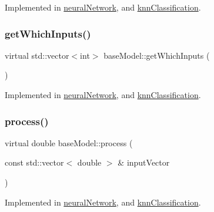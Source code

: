 Implemented in \hyperlink{classneural_network_aaf9ff8b1a88126fcffc1e9f07a4ffe49}{neural\+Network}, and \hyperlink{classknn_classification_a3f9c8fb78c6a66f0ab9440629140400d}{knn\+Classification}.

\mbox{\label{classbase_model_a5d6b7579536f5713eed0b7b4a6687a16}} 
\subsubsection{\texorpdfstring{get\+Which\+Inputs()}{getWhichInputs()}}
{\footnotesize\ttfamily virtual std\+::vector$<$int$>$ base\+Model\+::get\+Which\+Inputs (\begin{DoxyParamCaption}{ }\end{DoxyParamCaption})\hspace{0.3cm}{\ttfamily [pure virtual]}}



Implemented in \hyperlink{classneural_network_afc93cb28c3897d4d1faa4ac8fbf0c1f8}{neural\+Network}, and \hyperlink{classknn_classification_af7db9297f695e67df6af08719da37921}{knn\+Classification}.

\mbox{\label{classbase_model_a95ef1dffc2857cdd1a57c23f5f9ee2d1}} 
\subsubsection{\texorpdfstring{process()}{process()}}
{\footnotesize\ttfamily virtual double base\+Model\+::process (\begin{DoxyParamCaption}\item[{const std\+::vector$<$ double $>$ \&}]{input\+Vector }\end{DoxyParamCaption})\hspace{0.3cm}{\ttfamily [pure virtual]}}



Implemented in \hyperlink{classneural_network_a2d93cf6790db969ea067e8588b10d204}{neural\+Network}, and \hyperlink{classknn_classification_aedeef4367ed652c768eaf5682c8ec276}{knn\+Classification}.

\mbox{\label{classbase_model_ab6cbd549d6742029ab9768bc88467b4f}} 
